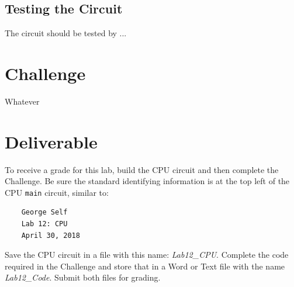 \subsection{Testing the Circuit}

The circuit should be tested by ...

\section{Challenge}

Whatever

\section{Deliverable}

To receive a grade for this lab, build the \ac{CPU} circuit and then complete the Challenge. Be sure the standard identifying information is at the top left of the \ac{CPU} \lstinline{main} circuit, similar to: 

\bigskip
\begin{minipage}{\linewidth}
	\begin{verbatim}
	George Self
	Lab 12: CPU
	April 30, 2018
	\end{verbatim}
\end{minipage}
\bigskip

Save the \ac{CPU} circuit in a file with this name: \textit{Lab12\_CPU}. Complete the code required in the Challenge and store that in a Word or Text file with the name \textit{Lab12\_Code}. Submit both files for grading.

